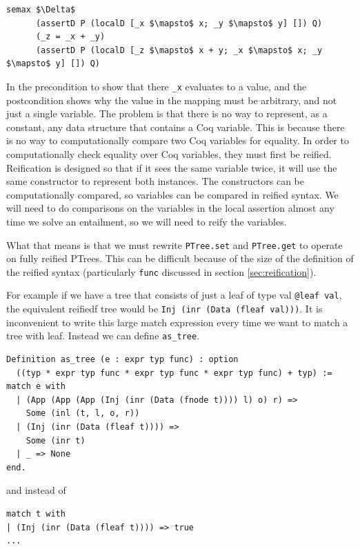 \documentclass{puthesis}
\begin{document}
\begin{lstlisting}
semax $\Delta$ 
      (assertD P (localD [_x $\mapsto$ x; _y $\mapsto$ y] []) Q) 
      (_z = _x + _y)
      (assertD P (localD [_z $\mapsto$ x + y; _x $\mapsto$ x; _y $\mapsto$ y] []) Q) 
\end{lstlisting}

In the precondition to show that there \lstinline|_x| evaluates to a
value, and the postcondition shows why the value in the mapping must
be arbitrary, and not just a single variable. The problem is that
there is no way to represent, as a constant, any data structure that contains a Coq
variable. This is because there is no way to
computationally compare two Coq variables for equality. In order to
computationally check equality over Coq variables, they must first be
reified.  Reification is designed so that if it sees the same variable
twice, it will use the same constructor to represent both
instances. The constructors can be computationally compared, so
variables can be compared in reified syntax.  We will need to do
comparisons on the variables in the local assertion almost any time we
solve an entailment, so we will need to reify the variables.

What that means is that we must rewrite \lstinline|PTree.set| and
\lstinline|PTree.get| to operate on fully reified PTrees. This can be
difficult because of the size of the definition of the reified syntax
(particularly \lstinline|func| discussed in section
\ref{sec:reification}). 

For example if we have a tree that consists of just a leaf of type val
\lstinline|@leaf val|, the equivalent reifiedf tree would be
\lstinline|Inj (inr (Data (fleaf val)))|. It is inconvenient to write
this large match expression every time we want to match a tree with
leaf. Instead we can define \lstinline|as_tree|.



\begin{lstlisting}
Definition as_tree (e : expr typ func) : option
  ((typ * expr typ func * expr typ func * expr typ func) + typ) := 
match e with
  | (App (App (App (Inj (inr (Data (fnode t)))) l) o) r) =>
    Some (inl (t, l, o, r))
  | (Inj (inr (Data (fleaf t)))) =>
    Some (inr t)
  | _ => None
end.
\end{lstlisting}

and instead of 

\begin{lstlisting}
match t with
| (Inj (inr (Data (fleaf t)))) => true
...
\end{lstlisting}
\end{document}
